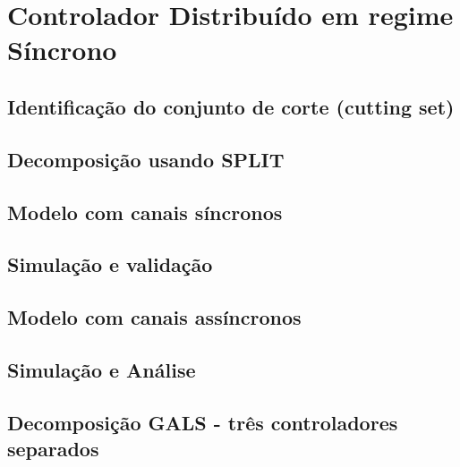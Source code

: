 \section{Controlador Distribuído em regime Síncrono}

\subsection{Identificação do conjunto de corte (cutting set)}

\subsection{Decomposição usando SPLIT}

\subsection{Modelo com canais síncronos}

\subsection{Simulação e validação}

\subsection{Modelo com canais assíncronos}

\subsection{Simulação e Análise}

\subsection{Decomposição GALS - três controladores separados}
